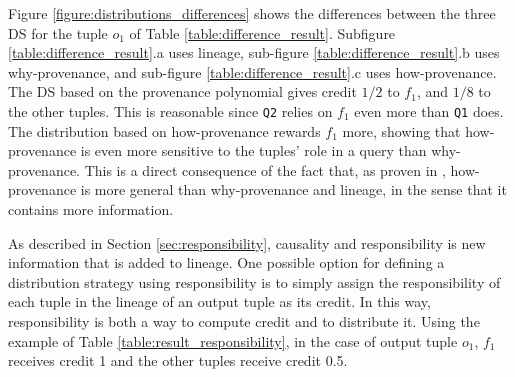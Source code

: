Figure \ref{figure:distributions_differences} shows the differences between the three DS for the tuple $o_1$ of Table \ref{table:difference_result}. Subfigure \ref{table:difference_result}.a uses lineage, sub-figure \ref{table:difference_result}.b uses why-provenance, and sub-figure \ref{table:difference_result}.c uses how-provenance. 
The DS based on the provenance polynomial gives credit $1/2$ to $f_1$, and $1/8$ to the other tuples.
This is reasonable since \texttt{Q2} relies on $f_1$ even more than \texttt{Q1} does. 
The distribution based on how-provenance rewards $f_1$ more, showing that how-provenance is even more sensitive to the tuples' role in a query than why-provenance. %
This is a direct consequence of the fact that, as proven in \citep{howProvenanceGreen}, how-provenance is more general than why-provenance and lineage, in the sense that it contains more information. 



As described in Section \ref{sec:responsibility}, causality and responsibility is 
new information that is added to lineage.   One possible option for defining a distribution strategy using responsibility is to simply assign the responsibility of each tuple in the lineage of an output tuple as its credit. In this way, responsibility is both a way to compute credit and to distribute it.
Using the example of Table \ref{table:result_responsibility}, in the case of output tuple $o_1$, $f_1$ receives credit 1 and the other tuples receive credit 0.5.


